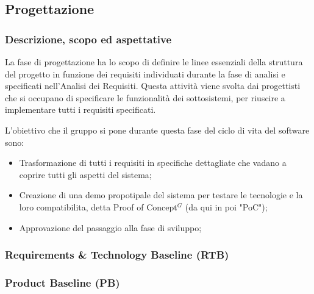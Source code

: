 \subsection{Progettazione}

\subsubsection{Descrizione, scopo ed aspettative}
La fase di progettazione ha lo scopo di definire le linee essenziali della struttura del progetto in funzione dei requisiti individuati durante la fase di analisi e specificati nell’Analisi dei Requisiti.
Questa attività viene svolta dai progettisti che si occupano di specificare le funzionalità dei sottosistemi, per riuscire a implementare tutti i requisiti specificati.

L'obiettivo che il gruppo si pone durante questa fase del ciclo di vita del software sono:
\begin{itemize}
    \item Trasformazione di tutti i requisiti in specifiche dettagliate che vadano a coprire tutti gli aspetti del sistema;
    \item Creazione di una demo propotipale del sistema per testare le tecnologie e la loro compatibilita, detta Proof of Concept$^{G}$ (da qui in poi "PoC");
    \item Approvazione del passaggio alla fase di sviluppo;
\end{itemize}

\subsubsection{Requirements \& Technology Baseline (RTB)}

\subsubsection{Product Baseline (PB)}